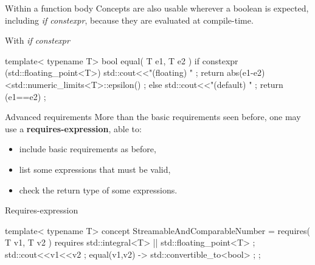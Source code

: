   \begin{frame}[fragile]
    \begin{block}{Within a function body}
    Concepts are also usable wherever a boolean is expected, including {\it if constexpr}, because they are evaluated at compile-time.
    \end{block}
    \begin{exampleblock}{With {\it if constexpr}}
      \scriptsize
      \begin{cppcode*}{}
      template< typename T>
      bool equal( T e1, T e2 )
      {
        if constexpr (std::floating_point<T>)
        {
          std::cout<<"(floating) " ;
          return abs(e1-e2)<std::numeric_limits<T>::epsilon() ;
        }
        else
        {
          std::cout<<"(default) " ;
          return (e1==e2) ;
        }
      }
      \end{cppcode*}
    \end{exampleblock}
  \end{frame}

  \begin{frame}[fragile]
    \begin{block}{Advanced requirements}
        More than the basic requirements seen before, one may use a \textbf{requires-expression}, able to:
        \begin{itemize}
            \item include basic requirements as before,
            \item list some expressions that must be valid,
            \item check the return type of some expressions.
        \end{itemize}
    \end{block}
    \begin{exampleblock}{Requires-expression}
      \scriptsize
      \begin{cppcode*}{}
      template< typename T>
      concept StreamableAndComparableNumber = requires( T v1, T v2 )
       {
        requires std::integral<T> || std::floating_point<T> ;
        std::cout<<v1<<v2 ;
        { equal(v1,v2) } -> std::convertible_to<bool> ;
       } ;
      \end{cppcode*}
    \end{exampleblock}
  \end{frame}
